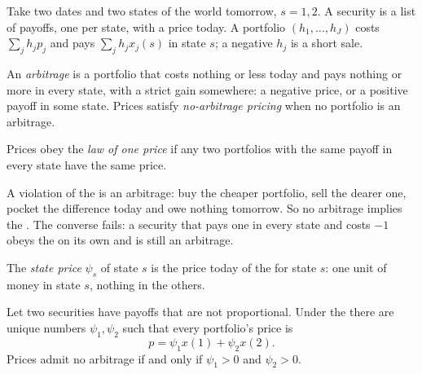 Take two dates and two states of the world tomorrow, $s = 1, 2$. A security is a list of payoffs, one
per state, with a price today. A portfolio $(h_1, \dots, h_J)$ costs $\sum_j h_j p_j$ and pays $\sum_j
h_j x_j(s)$ in state $s$; a negative $h_j$ is a short sale.

\begin{definition}\label{def:b2:asset-prices:no-arbitrage}
An \emph{arbitrage} is a portfolio that costs nothing or less today and pays nothing or more in every
state, with a strict gain somewhere: a negative price, or a positive payoff in some state. Prices satisfy
\emph{no-arbitrage pricing} when no portfolio is an arbitrage.
\end{definition}

\begin{definition}\label{def:b2:asset-prices:law-of-one-price}
Prices obey the \emph{law of one price} if any two portfolios with the same
payoff in every state have the same price.
\end{definition}

A violation of the  is an arbitrage: buy the cheaper portfolio, sell the dearer one,
pocket the difference today and owe nothing tomorrow. So no arbitrage implies the . The
converse fails: a security that pays one in every state and costs $-1$ obeys the  on
its own and is still an arbitrage.

\begin{definition}\label{def:b2:asset-prices:state-price}
The \emph{state price} $\psi_s$ of state $s$ is the price today of the 
for state $s$: one unit of money in state $s$, nothing in the others.
\end{definition}

\begin{proposition}\label{prop:b2:asset-prices:state-prices}
Let two securities have payoffs that are not proportional. Under the  there are unique
numbers $\psi_1, \psi_2$ such that every portfolio's price is
\[
p = \psi_1 x(1) + \psi_2 x(2).
\]
Prices admit no arbitrage if and only if $\psi_1 > 0$ and $\psi_2 > 0$.
\end{proposition}

